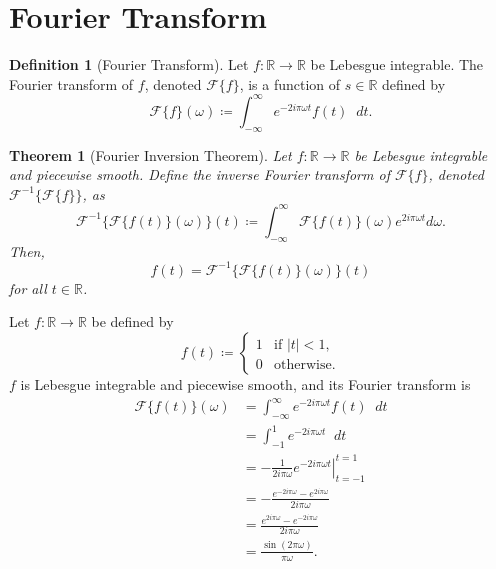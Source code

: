 \documentclass[a4paper]{article}
\newcommand*\diff{\mathop{}\!d} %
\newtheorem{theorem}{Theorem}
\theoremstyle{definition}
\newtheorem{definition}{Definition}
\begin{document}
\section{Fourier Transform}

\begin{definition}[Fourier Transform]
    Let $f: \mathbb{R} \to \mathbb{R}$ be Lebesgue integrable.
    The Fourier transform of $f$, denoted $\mathscr{F}\{f\}$, is a function of $s \in \mathbb{R}$ defined by
    \begin{equation}
        \mathscr{F}\{f\} (\omega) \coloneq \int_{-\infty}^{\infty} e^{-2i\pi \omega t} f(t) \diff t.
    \end{equation}
\end{definition}
\begin{theorem}[Fourier Inversion Theorem] \label{thm:Fourier inversion theorem}
    Let $f: \mathbb{R} \to \mathbb{R}$ be Lebesgue integrable and piecewise smooth.
    Define the inverse Fourier transform of $\mathscr{F}\{f\}$, denoted $\mathscr{F}^{-1}\{\mathscr{F}\{f\}\}$, as
    \begin{equation}
        \mathscr{F}^{-1}\{\mathscr{F}\{f(t)\}(\omega)\}(t) \coloneq \int_{-\infty}^{\infty} \mathscr{F}\{f(t)\}(\omega) e^{2i\pi\omega t} d\omega.
    \end{equation}
    Then,
    \begin{equation*}
        f(t) = \mathscr{F}^{-1}\{\mathscr{F}\{f(t)\}(\omega)\}(t)
    \end{equation*}
    for all $t \in \mathbb{R}$.
\end{theorem}
Let $f: \mathbb{R} \to \mathbb{R}$ be defined by
\begin{equation*}
    f(t) \coloneq
    \begin{cases}
        1 & \text{if } |t| < 1, \\
        0 & \text{otherwise}.
    \end{cases}
\end{equation*}
$f$ is Lebesgue integrable and piecewise smooth, and its Fourier transform is
\begin{align*}
    \mathscr{F}\{f(t)\}(\omega) & = \int_{-\infty}^{\infty} e^{-2i\pi \omega t} f(t) \diff t                \\
                                & = \int_{-1}^{1} e^{-2i\pi \omega t} \diff t                               \\
                                & = \left. - \frac{1}{2i\pi\omega} e^{-2i\pi \omega t} \right|_{t=-1}^{t=1} \\
                                & = -\frac{e^{-2i\pi \omega} - e^{2i\pi \omega}}{2i\pi\omega}               \\
                                & = \frac{e^{2i\pi \omega} - e^{-2i\pi \omega}}{2i\pi\omega}                \\
                                & = \frac{\sin(2\pi \omega)}{\pi\omega}.
\end{align*}
\end{document}
